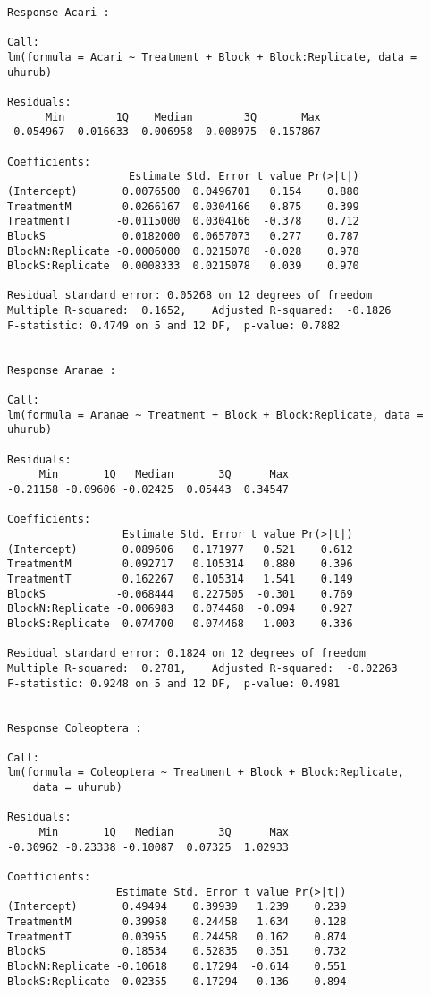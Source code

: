\documentclass[11pt]{article}
\begin{document}
\begin{verbatim}
Response Acari :

Call:
lm(formula = Acari ~ Treatment + Block + Block:Replicate, data = uhurub)

Residuals:
      Min        1Q    Median        3Q       Max 
-0.054967 -0.016633 -0.006958  0.008975  0.157867 

Coefficients:
                   Estimate Std. Error t value Pr(>|t|)
(Intercept)       0.0076500  0.0496701   0.154    0.880
TreatmentM        0.0266167  0.0304166   0.875    0.399
TreatmentT       -0.0115000  0.0304166  -0.378    0.712
BlockS            0.0182000  0.0657073   0.277    0.787
BlockN:Replicate -0.0006000  0.0215078  -0.028    0.978
BlockS:Replicate  0.0008333  0.0215078   0.039    0.970

Residual standard error: 0.05268 on 12 degrees of freedom
Multiple R-squared:  0.1652,	Adjusted R-squared:  -0.1826 
F-statistic: 0.4749 on 5 and 12 DF,  p-value: 0.7882


Response Aranae :

Call:
lm(formula = Aranae ~ Treatment + Block + Block:Replicate, data = uhurub)

Residuals:
     Min       1Q   Median       3Q      Max 
-0.21158 -0.09606 -0.02425  0.05443  0.34547 

Coefficients:
                  Estimate Std. Error t value Pr(>|t|)
(Intercept)       0.089606   0.171977   0.521    0.612
TreatmentM        0.092717   0.105314   0.880    0.396
TreatmentT        0.162267   0.105314   1.541    0.149
BlockS           -0.068444   0.227505  -0.301    0.769
BlockN:Replicate -0.006983   0.074468  -0.094    0.927
BlockS:Replicate  0.074700   0.074468   1.003    0.336

Residual standard error: 0.1824 on 12 degrees of freedom
Multiple R-squared:  0.2781,	Adjusted R-squared:  -0.02263 
F-statistic: 0.9248 on 5 and 12 DF,  p-value: 0.4981


Response Coleoptera :

Call:
lm(formula = Coleoptera ~ Treatment + Block + Block:Replicate, 
    data = uhurub)

Residuals:
     Min       1Q   Median       3Q      Max 
-0.30962 -0.23338 -0.10087  0.07325  1.02933 

Coefficients:
                 Estimate Std. Error t value Pr(>|t|)
(Intercept)       0.49494    0.39939   1.239    0.239
TreatmentM        0.39958    0.24458   1.634    0.128
TreatmentT        0.03955    0.24458   0.162    0.874
BlockS            0.18534    0.52835   0.351    0.732
BlockN:Replicate -0.10618    0.17294  -0.614    0.551
BlockS:Replicate -0.02355    0.17294  -0.136    0.894


\end{verbatim}
\end{document}
